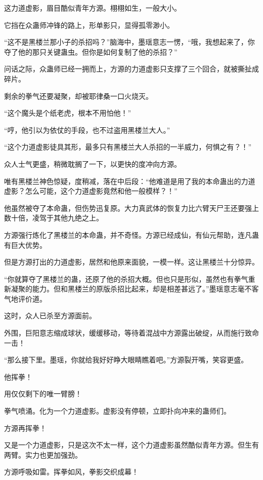
\begin{this_body}

这力道虚影，眉目酷似青年方源。栩栩如生，一般大小。

它挡在众蛊师冲锋的路上，形单影只，显得孤零渺小。

“这不是黑楼兰那小子的杀招吗？”脑海中，墨瑶意志一愣，“哦，我想起来了，你夺了他的那只关键蛊虫。但你是如何复制了他的杀招？”

问话之际，众蛊师已经一拥而上，方源的力道虚影只支撑了三个回合，就被撕扯成碎片。

剩余的拳气还要凝聚，却被耶律桑一口火烧灭。

“这个魔头是个纸老虎，根本不用怕他！”

“哼，他引以为依仗的手段，也不过盗用黑楼兰大人。”

“这个力道虚影徒具其形，最多只有黑楼兰大人杀招的一半威力，何惧之有？！”

众人士气更盛，稍微耽搁了一下，以更快的度冲向方源。

唯有黑楼兰神色惊疑，度稍减，落在中后段：“他难道是用了我的本命蛊出的力道虚影？怎么可能，这个力道虚影竟然和他一般模样？！”

他虽然被夺了本命蛊，但伤势迅复原。大力真武体的恢复力比六臂天尸王还要强上数十倍，凌驾于其他九绝之上。

方源强行炼化了黑楼兰的本命蛊，并不奇怪。方源已经成仙，有仙元帮助，连凡蛊有巨大优势。

但是方源打出的力道虚影，居然和他原来面貌，一模一样。这让黑楼兰十分惊异。

“你就算夺了黑楼兰的蛊，还原了他的杀招大概。但也只是形似，虽然也有拳气重新凝聚的能力。但和黑楼兰的原版杀招比起来，却是相差甚远了。”墨瑶意志毫不客气地评价道。

这时，众人已杀至方源面前。

外围，巨阳意志缩成球状，缓缓移动，等待着混战中方源露出破绽，从而施行致命一击！

“那么接下里。墨瑶，你就给我好好睁大眼睛瞧着吧。”方源裂开嘴，笑容更盛。

他挥拳！

用仅仅剩下的唯一臂膀！

拳气喷涌。化为一个力道虚影。虚影没有停顿，立即扑向冲来的蛊师们。

方源再挥拳！

又是一个力道虚影，只是这次不太一样，这个力道虚影虽然酷似青年方源。但生有两臂。实力也更加强劲。

方源呼吸如雷。挥拳如风，拳影交织成幕！


\end{this_body}
